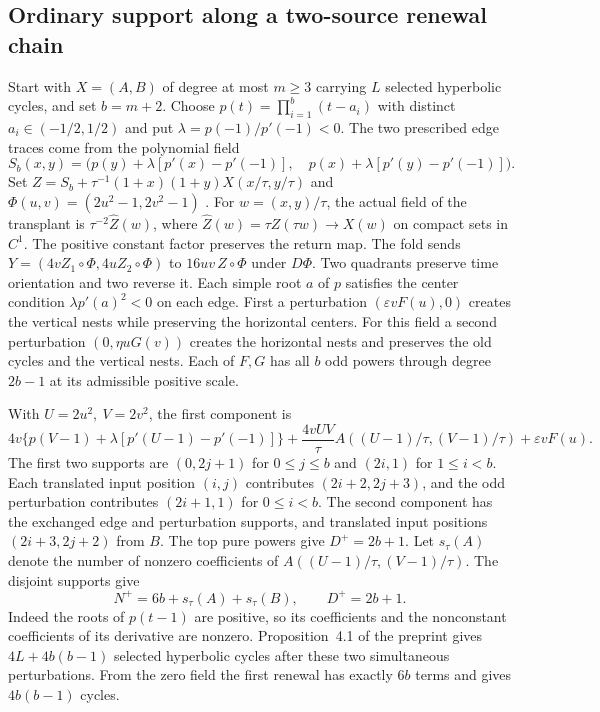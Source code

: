 \subsection{Ordinary support along a two-source renewal chain}\label{sup:renewal-support}
Start with \(X=(A,B)\) of degree at most \(m\ge3\) carrying \(L\) selected hyperbolic cycles, and set \(b=m+2\). Choose \(p(t)=\prod_{i=1}^b(t-a_i)\) with distinct \(a_i\in(-1/2,1/2)\) and put \(\lambda=p(-1)/p'(-1)<0\). The two prescribed edge traces come from the polynomial field
\[
 S_b(x,y)=\bigl(p(y)+\lambda[p'(x)-p'(-1)],\quad
                 p(x)+\lambda[p'(y)-p'(-1)]\bigr).
\]
Set \(Z=S_b+\tau^{-1}(1+x)(1+y)X(x/\tau,y/\tau)\) and \(\Phi(u,v)=(2u^2-1,2v^2-1)\) \cite[Lemma~2.1, Proposition~2.2 and (21)--(26)]{LuRenewal}. For \(w=(x,y)/\tau\), the actual field of the transplant is \(\tau^{-2}\widehat Z(w)\), where \(\widehat Z(w)=\tau Z(\tau w)\to X(w)\) on compact sets in \(C^1\). The positive constant factor preserves the return map. The fold sends \(Y=(4vZ_1\circ\Phi,4uZ_2\circ\Phi)\) to \(16uv\,Z\circ\Phi\) under \(D\Phi\). Two quadrants preserve time orientation and two reverse it. Each simple root \(a\) of \(p\) satisfies the center condition \(\lambda p'(a)^2<0\) on each edge. First a perturbation \((\varepsilon v F(u),0)\) creates the vertical nests while preserving the horizontal centers. For this field a second perturbation \((0,\eta uG(v))\) creates the horizontal nests and preserves the old cycles and the vertical nests. Each of \(F,G\) has all \(b\) odd powers through degree \(2b-1\) at its admissible positive scale.

With \(U=2u^2,\ V=2v^2\), the first component is
\[
 4v\{p(V-1)+\lambda[p'(U-1)-p'(-1)]\}
 +\frac{4vUV}{\tau}A((U-1)/\tau,(V-1)/\tau)+\varepsilon vF(u).
\]
The first two supports are \((0,2j+1)\) for \(0\le j\le b\) and \((2i,1)\) for \(1\le i<b\). Each translated input position \((i,j)\) contributes \((2i+2,2j+3)\), and the odd perturbation contributes \((2i+1,1)\) for \(0\le i<b\). The second component has the exchanged edge and perturbation supports, and translated input positions \((2i+3,2j+2)\) from \(B\). The top pure powers give \(D^+=2b+1\). Let \(s_\tau(A)\) denote the number of nonzero coefficients of \(A((U-1)/\tau,(V-1)/\tau)\). The disjoint supports give
\begin{equation}\label{eq:renewal-support}
 N^+=6b+s_\tau(A)+s_\tau(B),\qquad D^+=2b+1 .
\end{equation}
Indeed the roots of \(p(t-1)\) are positive, so its coefficients and the nonconstant coefficients of its derivative are nonzero. Proposition~4.1 of the preprint gives \(4L+4b(b-1)\) selected hyperbolic cycles after these two simultaneous perturbations. From the zero field the first renewal has exactly \(6b\) terms and gives \(4b(b-1)\) cycles.

